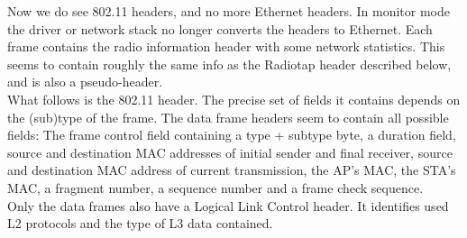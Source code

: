 Now we do see 802.11 headers, and no more Ethernet headers. In monitor mode the driver or network stack no longer converts the headers to Ethernet. Each frame contains the radio information header with some network statistics. This seems to contain roughly the same info as the Radiotap header described below, and is also a pseudo-header. \\
What follows is the 802.11 header. The precise set of fields it contains depends on the (sub)type of the frame. The data frame headers seem to contain all possible fields: The frame control field containing a type + subtype byte, a duration field, source and destination MAC addresses of initial sender and final receiver, source and destination MAC address of current transmission, the AP's MAC, the STA's MAC, a fragment number, a sequence number and a frame check sequence. \\
Only the data frames also have a Logical Link Control header. It identifies used L2 protocols and the type of L3 data contained.
